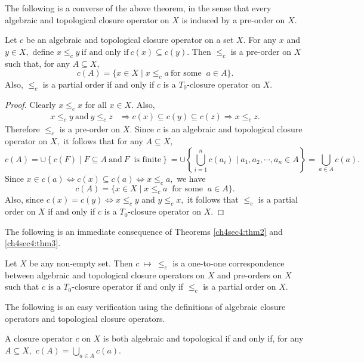 \documentclass[
11pt,%
tightenlines,%
twoside,%
onecolumn,%
nofloats,%
nobibnotes,%
nofootinbib,%
superscriptaddress,%
noshowpacs,%
centertags]%
{revtex4}
\begin{document}
The following is a converse of the above  theorem, in the sense that
every algebraic and topological closure operator on $X$ is induced
by a pre-order on $X.$
\begin{theorem}
\label{ch4sec4:thm3} Let $c$ be an algebraic and topological closure
operator  on a set $X.$ For any $x$ and $y \in X,$ define $x \leq_c
y ~\text{if and only if}~ c(x) \subseteq c(y).$ Then $\leq_c$ is a
pre-order on $X$ such that, for any $A \subseteq X,$
$$
c(A) = \{x \in X \mid x \leq_c a ~\text{for some }~ a \in A \}.
$$ Also, $\leq_c$ is a partial order if and only if $c$ is a $T_0$-closure operator
on $X.$
\end{theorem}
\begin{proof}
Clearly $x \leq_c x$ for all $x \in X.$ Also,
\begin{align*}
x \leq_c y ~\text{and}~ y \leq_c z & \Longrightarrow c(x) \subseteq c(y) \subseteq c(z)
 \Longrightarrow x \leq_c z.
\end{align*}
Therefore $\leq_c$ is a pre-order on $X.$ Since $c$ is an algebraic
and topological closure operator on $X,$ it follows that for any $A
\subseteq X, $
$$
c(A) = \cup \left \{ c(F) \mid F \subseteq A ~\text{and}~ F ~ \text{ is finite} \right \}  =   \cup \left\{ \bigcup \limits _{i=1} ^{n} c(a_i) \mid a_1, a_2, \cdots,a_n \in A  \right \}
 = \bigcup \limits _{a \in A} c(a).
$$
Since $x \in c(a) \Longleftrightarrow c(x) \subseteq c(a) \Longleftrightarrow x \leq_c a,$ we have
$$c(A) = \{ x \in X \mid x \leq_c a  ~\text{ for some }~ a \in A \}.$$
Also, since $c(x)=c(y) \Longleftrightarrow x \leq_c y $ and $y
\leq_c x,$  it follows that $\leq_c$ is a partial order on $X$ if
and only if $c$ is a $T_0$-closure operator on $X.$
\end{proof}
The following is an immediate consequence of Theorems \ref{ch4sec4:thm2} and \ref{ch4sec4:thm3}.
\begin{corollary}
\label{ch4sec4:cor4} Let $X$ be any non-empty set. Then $c ~\mapsto~
\leq_c$ is a one-to-one  correspondence between algebraic and
topological closure operators on $X$ and pre-orders on $X$ such that
$c$ is a $T_0$-closure operator if and only if $\leq_c$ is a partial
order on $X.$
\end{corollary}

The following is an easy verification using the definitions of
algebraic  closure operators and topological closure operators.

\begin{theorem}
\label{ch4sec4:thm5}
A closure operator $c$ on $X$ is both algebraic and topological if and only if, for any $A \subseteq X,$
$c(A) = \bigcup _{ a \in A} c(a)$.
\end{theorem}
\end{document}
